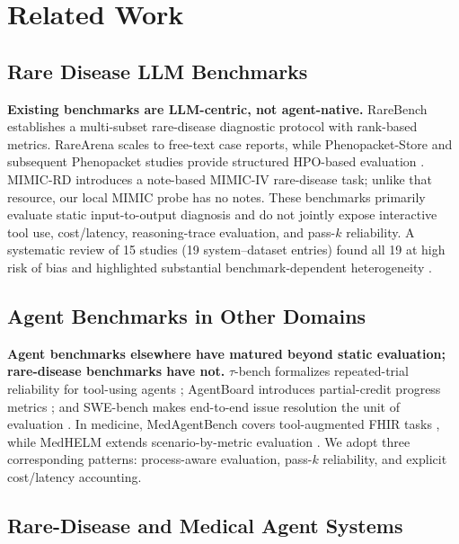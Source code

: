 \section{Related Work}\label{sec-3}

\subsection{Rare Disease LLM Benchmarks}\label{sec-3-1}

\textbf{Existing benchmarks are LLM-centric, not agent-native.} RareBench
\citep{rarebench2024} establishes a multi-subset rare-disease diagnostic
protocol with rank-based metrics. RareArena \citep{rarearena2025} scales to
free-text case reports, while Phenopacket-Store and subsequent Phenopacket
studies provide structured HPO-based evaluation
\citep{phenopacketstore2025,reese2026,chimirri2025}. MIMIC-RD
\citep{mimicrd2026} introduces a note-based MIMIC-IV rare-disease task; unlike
that resource, our local MIMIC probe has no notes. These benchmarks primarily
evaluate static input-to-output diagnosis and do not jointly expose interactive
tool use, cost/latency, reasoning-trace evaluation, and pass-\(k\) reliability.
A systematic review of 15 studies (19 system--dataset entries) found all 19 at
high risk of bias and highlighted substantial benchmark-dependent
heterogeneity \citep{sysreview2026}.

\subsection{Agent Benchmarks in Other Domains}\label{sec-3-2}

\textbf{Agent benchmarks elsewhere have matured beyond static evaluation; rare-disease benchmarks have not.} \(\tau\)-bench formalizes repeated-trial
reliability for tool-using agents \citep{taubench2024}; AgentBoard introduces
partial-credit progress metrics \citep{agentboard2024}; and SWE-bench makes
end-to-end issue resolution the unit of evaluation \citep{swebench2024}. In
medicine, MedAgentBench covers tool-augmented FHIR tasks
\citep{medagentbench2025}, while MedHELM extends scenario-by-metric evaluation
\citep{medhelm2025}. We adopt three corresponding patterns: process-aware
evaluation, pass-\(k\) reliability, and explicit cost/latency accounting.

\subsection{Rare-Disease and Medical Agent Systems}\label{sec-3-3}

